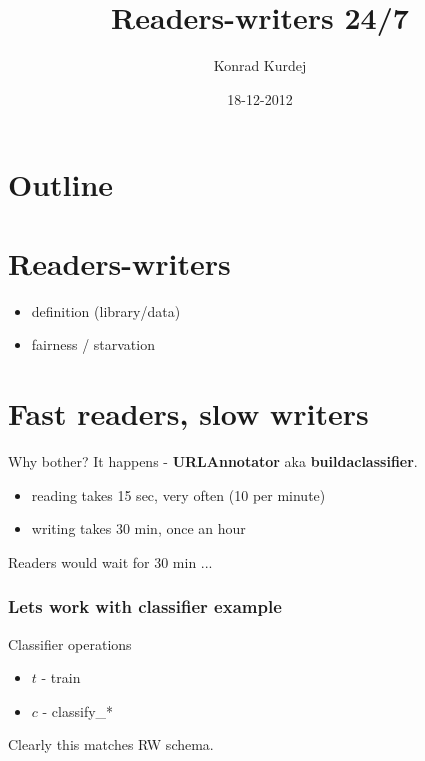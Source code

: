 \documentclass{beamer}
\title{Readers-writers 24/7}
\author{Konrad Kurdej}
\date{18-12-2012}
\begin{document}
\begin{frame}
\titlepage
\end{frame}
\section*{Outline}
\begin{frame}
\tableofcontents
\end{frame}

\section{Readers-writers}
\begin{frame}
\begin{itemize}
 \item definition (library/data)
 \item fairness / starvation
\end{itemize}
\end{frame}


\section{Fast readers, slow writers}

\begin{frame}
\pause
\begin{block}{Why bother?}
\pause
It happens - \textbf{URLAnnotator} aka \textbf{buildaclassifier}.
\end{block}

\pause
\begin{example}[]
\begin{itemize}
 \item reading takes 15 sec, very often (10 per minute)
 \item writing takes 30 min, once an hour
\end{itemize}
\end{example}

\pause
Readers would wait for 30 min ...

\end{frame}


\begin{frame}
\frametitle{Lets work with classifier example}

\begin{block}{Classifier operations}
\begin{itemize}
 \item $t$ - train
 \item $c$ - classify\_*
\end{itemize}
\end{block}
Clearly this matches RW schema.

\end{frame}
\end{document}
